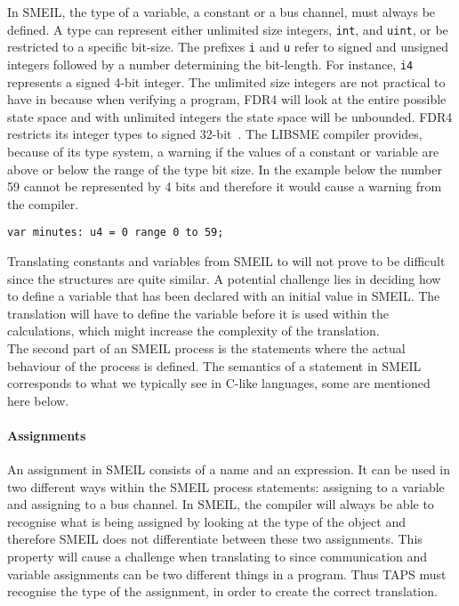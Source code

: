 In SMEIL, the type of a variable, a constant or a bus channel, must always be defined. A type can represent either unlimited size integers, \texttt{int}, and \texttt{uint}, or be restricted to a specific bit-size. The prefixes \texttt{i} and \texttt{u} refer to signed and unsigned integers followed by a number determining the bit-length. For instance, \texttt{i4} represents a signed 4-bit integer. The unlimited size integers are not practical to have in \cspm{} because when verifying a program, FDR4 will look at the entire possible state space and with unlimited integers the state space will be unbounded. FDR4 restricts its integer types to signed 32-bit~\cite{fdrmanual}. The LIBSME compiler provides, because of its type system, a warning if the values of a constant or variable are above or below the range of the type bit size. In the example below the number 59 cannot be represented by 4 bits and therefore it would cause a warning from the compiler.\\
\begin{verbatim}
var minutes: u4 = 0 range 0 to 59;
\end{verbatim}

Translating constants and variables from SMEIL to \cspm{} will not prove to be difficult since the structures are quite similar.
A potential challenge lies in deciding how to define a variable that has been declared with an initial value in SMEIL. The \cspm{} translation will have to define the variable before it is used within the calculations, which might increase the complexity of the translation.\\

The second part of an SMEIL process is the statements where the actual behaviour of the process is defined. The semantics of a statement in SMEIL corresponds to what we typically see in C-like languages, some are mentioned here below.
\paragraph{Assignments}
An assignment in SMEIL consists of a name and an expression. It can be used in two different ways within the SMEIL process statements: assigning to a variable and assigning to a bus channel. In SMEIL, the compiler will always be able to recognise what is being assigned by looking at the type of the object and therefore SMEIL does not differentiate between these two assignments. This property will cause a challenge when translating to \cspm{} since communication and variable assignments can be two different things in a \cspm{} program. Thus TAPS must recognise the type of the assignment, in order to create the correct translation.

